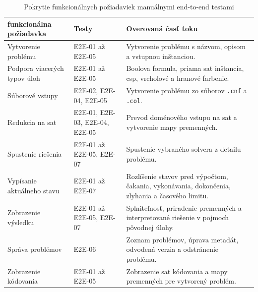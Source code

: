 \begin{table}[H]
    \centering
    \caption{Pokrytie funkcionálnych požiadaviek manuálnymi end-to-end testami}
    \label{tab:functional-requirements-e2e-coverage}
    \begin{tabular}{|p{}|p{}|p{}|}
        \hline
        funkcionálna požiadavka      & Testy                          & Overovaná časť toku                                                                             \\
        \hline
        Vytvorenie problému          & E2E-01 až E2E-05               & Vytvorenie problému s názvom, opisom a vstupnou inštanciou.                                     \\
        \hline
        Podpora viacerých typov úloh & E2E-01 až E2E-05               & Boolova formula, priama \acrshort{sat} inštancia, \acrshort{csp}, vrcholové a hranové farbenie. \\
        \hline
        Súborové vstupy              & E2E-02, E2E-04, E2E-05         & Vytvorenie problému zo súborov \texttt{.cnf} a \texttt{.col}.                                   \\
        \hline
        Redukcia na \acrshort{sat}   & E2E-01, E2E-03, E2E-04, E2E-05 & Prevod doménového vstupu na \acrshort{sat} a vytvorenie mapy premenných.                        \\
        \hline
        Spustenie riešenia           & E2E-01 až E2E-05, E2E-07       & Spustenie vybraného solvera z detailu problému.                                                 \\
        \hline
        Vypísanie aktuálneho stavu   & E2E-01 až E2E-07               & Rozlíšenie stavov pred výpočtom, čakania, vykonávania, dokončenia, zlyhania a časového limitu.  \\
        \hline
        Zobrazenie výsledku          & E2E-01 až E2E-05, E2E-07       & Splniteľnosť, priradenie premenných a interpretované riešenie v pojmoch pôvodnej úlohy.         \\
        \hline
        Správa problémov             & E2E-06                         & Zoznam problémov, úprava metadát, odvodená verzia a odstránenie problému.                       \\
        \hline
        Zobrazenie kódovania         & E2E-01 až E2E-05               & Zobrazenie \acrshort{sat} kódovania a mapy premenných pre vytvorený problém.                    \\
        \hline
    \end{tabular}
\end{table}

